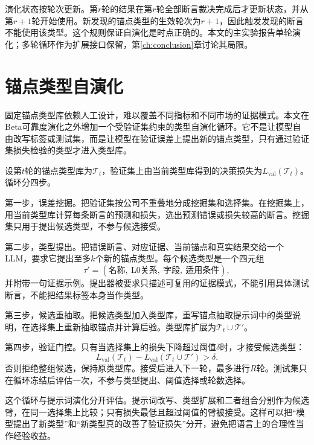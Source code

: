 演化状态按轮次更新。第$r$轮的结果在第$r$轮全部断言裁决完成后才更新状态，并从第$r+1$轮开始使用。新发现的锚点类型的生效轮次为$r+1$，因此触发发现的断言不能使用该类型。这个规则保证自演化是时点正确的。本文的主实验报告单轮演化；多轮循环作为扩展接口保留，第\ref{ch:conclusion}章讨论其局限。

\section{锚点类型自演化}

固定锚点类型库依赖人工设计，难以覆盖不同指标和不同市场的证据模式。本文在Beta可靠度演化之外增加一个受验证集约束的类型自演化循环。它不是让模型自由改写标签或测试集，而是让模型在验证误差上提出新的锚点类型，只有通过验证集损失检验的类型才进入类型库。

设第$t$轮的锚点类型库为$\mathcal T_t$，验证集上由当前类型库得到的决策损失为$L_{\mathrm{val}}(\mathcal T_t)$。循环分四步。

第一步，误差挖掘。把验证集按公司不重叠地分成挖掘集和选择集。在挖掘集上，用当前类型库计算每条断言的预测和损失，选出预测错误或损失较高的断言。挖掘集只用于提出候选类型，不参与候选接受。

第二步，类型提出。把错误断言、对应证据、当前锚点和真实结果交给一个LLM，要求它提出至多$k$个新的锚点类型。每个候选类型是一个四元组
\begin{equation}
\tau'=(\text{名称},\ \text{L0关系},\ \text{字段},\ \text{适用条件}),
\label{eq:candidatetype}
\end{equation}
并附带一句证据示例。提出器被要求只描述可复用的证据模式，不能引用具体测试断言，不能把结果标签本身当作类型。

第三步，候选重抽取。把候选类型加入类型库，重写锚点抽取提示词中的类型说明，在选择集上重新抽取锚点并计算后验。类型库扩展为$\mathcal T_t\cup\mathcal T'$。

第四步，验证门控。只有当选择集上的损失下降超过阈值$\delta$时，才接受候选类型：
\begin{equation}
L_{\mathrm{val}}(\mathcal T_t)-L_{\mathrm{val}}(\mathcal T_t\cup\mathcal T')>\delta.
\label{eq:typeaccept}
\end{equation}
否则拒绝整组候选，保持原类型库。接受后进入下一轮，最多进行$R$轮。测试集只在循环冻结后评估一次，不参与类型提出、阈值选择或轮数选择。

这个循环与提示词演化分开评估。提示词改写、类型扩展和二者组合分别作为候选臂，在同一选择集上比较；只有损失最低且超过阈值的臂被接受。这样可以把“模型提出了新类型”和“新类型真的改善了验证损失”分开，避免把语言上的合理性当作经验收益。

